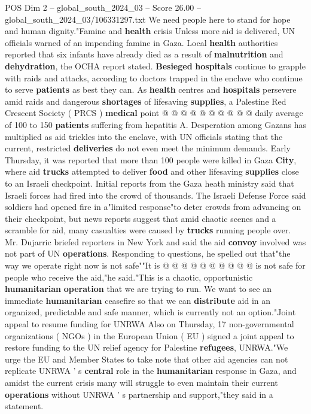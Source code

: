 \begin{textsample}{POS Dim 2 – global\_south\_2024\_03 – Score 26.00 – global\_south\_2024\_03/106331297.txt}
We need people here to stand for hope and human dignity."Famine and \textbf{health} crisis Unless more aid is delivered, UN officials warned of an impending famine in Gaza.
Local \textbf{health} authorities reported that six infants have already died as a result of \textbf{malnutrition} and \textbf{dehydration}, the OCHA report stated. \textbf{Besieged} \textbf{hospitals} continue to grapple with raids and attacks, according to doctors trapped in the enclave who continue to serve \textbf{patients} as best they can.
As \textbf{health} centres and \textbf{hospitals} persevere amid raids and dangerous \textbf{shortages} of lifesaving \textbf{supplies}, a Palestine Red Crescent Society ( PRCS ) \textbf{medical} point @ @ @ @ @ @ @ @ @ @ daily average of 100 to 150 \textbf{patients} suffering from hepatitis A.
Desperation among Gazans has multiplied as aid trickles into the enclave, with UN officials stating that the current, restricted \textbf{deliveries} do not even meet the minimum demands.
Early Thursday, it was reported that more than 100 people were killed in Gaza \textbf{City}, where aid \textbf{trucks} attempted to deliver \textbf{food} and other lifesaving \textbf{supplies} close to an Israeli checkpoint.
Initial reports from the Gaza heath ministry said that Israeli forces had fired into the crowd of thousands.
The Israeli Defense Force said soldiers had opened fire in a"limited response"to deter crowds from advancing on their checkpoint, but news reports suggest that amid chaotic scenes and a scramble for aid, many casualties were caused by \textbf{trucks} running people over.
Mr.
Dujarric briefed reporters in New York and said the aid \textbf{convoy} involved was not part of UN \textbf{operations}.
Responding to questions, he spelled out that"the way we operate right now is not safe""It is @ @ @ @ @ @ @ @ @ @ is not safe for people who receive the aid,"he said."This is a chaotic, opportunistic \textbf{humanitarian} \textbf{operation} that we are trying to run.
We want to see an immediate \textbf{humanitarian} ceasefire so that we can \textbf{distribute} aid in an organized, predictable and safe manner, which is currently not an option."Joint appeal to resume funding for UNRWA Also on Thursday, 17 non-governmental organizations ( NGOs ) in the European Union ( EU ) signed a joint appeal to restore funding to the UN relief agency for Palestine \textbf{refugees}, UNRWA."We urge the EU and Member States to take note that other aid agencies can not replicate UNRWA ' s \textbf{central} role in the \textbf{humanitarian} response in Gaza, and amidst the current crisis many will struggle to even maintain their current \textbf{operations} without UNRWA ' s partnership and support,"they said in a statement.

\end{textsample}
